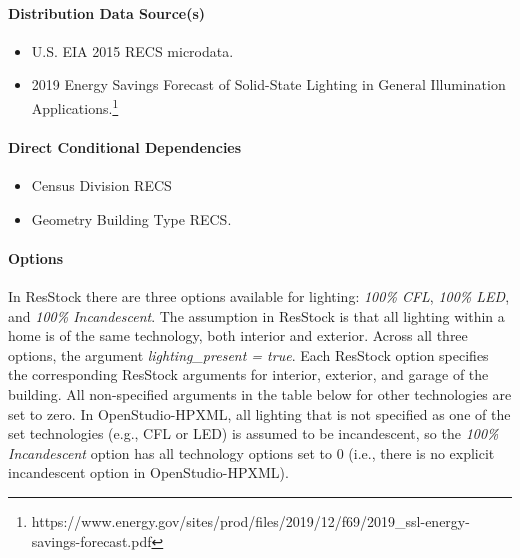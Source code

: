 \paragraph{Distribution Data Source(s)}\label{source-107}

\begin{itemize}
 
\item
  U.S. EIA 2015 RECS microdata.
\item
  2019 Energy Savings Forecast of Solid-State Lighting in General
  Illumination Applications.\footnote{https://www.energy.gov/sites/prod/files/2019/12/f69/2019\_ssl-energy-savings-forecast.pdf}
\end{itemize}

\paragraph{Direct Conditional Dependencies}
\begin{itemize}
    \item{Census Division RECS}
    \item{Geometry Building Type RECS}.
\end{itemize}



\paragraph{Options}\label{options-108}
In ResStock there are three options available for lighting: \textit{100\% CFL}, \textit{100\% LED}, and \textit{100\% Incandescent}. The assumption in ResStock is that all lighting within a home is of the same technology, both interior and exterior. Across all three options, the argument \textit{lighting\_present = true}. Each ResStock option specifies the corresponding ResStock arguments for interior, exterior, and garage of the building. All non-specified arguments in the table below for other technologies are set to zero. In OpenStudio-HPXML, all lighting that is not specified as one of the set technologies (e.g., CFL or LED) is assumed to be incandescent, so the \textit{100\% Incandescent} option has all technology options set to 0 (i.e., there is no explicit incandescent option in OpenStudio-HPXML). 

